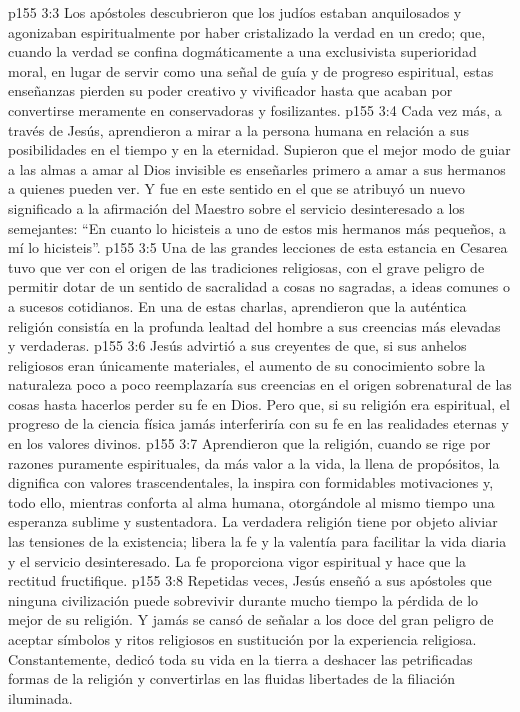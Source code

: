 \vs p155 3:3 Los apóstoles descubrieron que los judíos estaban anquilosados y agonizaban espiritualmente por haber cristalizado la verdad en un credo; que, cuando la verdad se confina dogmáticamente a una exclusivista superioridad moral, en lugar de servir como una señal de guía y de progreso espiritual, estas enseñanzas pierden su poder creativo y vivificador hasta que acaban por convertirse meramente en conservadoras y fosilizantes.
\vs p155 3:4 Cada vez más, a través de Jesús, aprendieron a mirar a la persona humana en relación a sus posibilidades en el tiempo y en la eternidad. Supieron que el mejor modo de guiar a las almas a amar al Dios invisible es enseñarles primero a amar a sus hermanos a quienes pueden ver. Y fue en este sentido en el que se atribuyó un nuevo significado a la afirmación del Maestro sobre el servicio desinteresado a los semejantes: “En cuanto lo hicisteis a uno de estos mis hermanos más pequeños, a mí lo hicisteis”.
\vs p155 3:5 Una de las grandes lecciones de esta estancia en Cesarea tuvo que ver con el origen de las tradiciones religiosas, con el grave peligro de permitir dotar de un sentido de sacralidad a cosas no sagradas, a ideas comunes o a sucesos cotidianos. En una de estas charlas, aprendieron que la auténtica religión consistía en la profunda lealtad del hombre a sus creencias más elevadas y verdaderas.
\vs p155 3:6 Jesús advirtió a sus creyentes de que, si sus anhelos religiosos eran únicamente materiales, el aumento de su conocimiento sobre la naturaleza poco a poco reemplazaría sus creencias en el origen sobrenatural de las cosas hasta hacerlos perder su fe en Dios. Pero que, si su religión era espiritual, el progreso de la ciencia física jamás interferiría con su fe en las realidades eternas y en los valores divinos.
\vs p155 3:7 Aprendieron que la religión, cuando se rige por razones puramente espirituales, da más valor a la vida, la llena de propósitos, la dignifica con valores trascendentales, la inspira con formidables motivaciones y, todo ello, mientras conforta al alma humana, otorgándole al mismo tiempo una esperanza sublime y sustentadora. La verdadera religión tiene por objeto aliviar las tensiones de la existencia; libera la fe y la valentía para facilitar la vida diaria y el servicio desinteresado. La fe proporciona vigor espiritual y hace que la rectitud fructifique.
\vs p155 3:8 Repetidas veces, Jesús enseñó a sus apóstoles que ninguna civilización puede sobrevivir durante mucho tiempo la pérdida de lo mejor de su religión. Y jamás se cansó de señalar a los doce del gran peligro de aceptar símbolos y ritos religiosos en sustitución por la experiencia religiosa. Constantemente, dedicó toda su vida en la tierra a deshacer las petrificadas formas de la religión y convertirlas en las fluidas libertades de la filiación iluminada.
